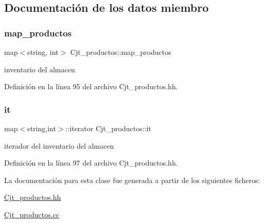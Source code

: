 \subsection{Documentación de los datos miembro}
\mbox{\label{class_cjt__productos_a44e63c644fdec6cff81dcdb3cf79860c}} 
\subsubsection{\texorpdfstring{map\+\_\+productos}{map\_productos}}
{\footnotesize\ttfamily map$<$string, int$>$ Cjt\+\_\+productos\+::map\+\_\+productos\hspace{0.3cm}{\ttfamily [private]}}



inventario del almacen 



Definición en la línea 95 del archivo Cjt\+\_\+productos.\+hh.

\mbox{\label{class_cjt__productos_adedbe2194ed053eb446ec367e6d5e60e}} 
\subsubsection{\texorpdfstring{it}{it}}
{\footnotesize\ttfamily map$<$string,int$>$\+::iterator Cjt\+\_\+productos\+::it\hspace{0.3cm}{\ttfamily [private]}}



iterador del inventario del almacen 



Definición en la línea 97 del archivo Cjt\+\_\+productos.\+hh.



La documentación para esta clase fue generada a partir de los siguientes ficheros\+:\begin{DoxyCompactItemize}
\item 
\hyperlink{_cjt__productos_8hh}{Cjt\+\_\+productos.\+hh}\item 
\hyperlink{_cjt__productos_8cc}{Cjt\+\_\+productos.\+cc}\end{DoxyCompactItemize}

